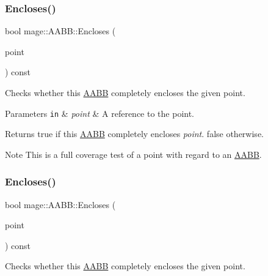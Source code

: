 \subsubsection{\texorpdfstring{Encloses()}{Encloses()}\hspace{0.1cm}{\footnotesize\ttfamily [1/4]}}
{\footnotesize\ttfamily bool mage\+::\+A\+A\+B\+B\+::\+Encloses (\begin{DoxyParamCaption}\item[{const \hyperlink{structmage_1_1_point3}{Point3} \&}]{point }\end{DoxyParamCaption}) const\hspace{0.3cm}{\ttfamily [noexcept]}}

Checks whether this \hyperlink{structmage_1_1_a_a_b_b}{A\+A\+BB} completely encloses the given point.


\begin{DoxyParams}[1]{Parameters}
\mbox{\tt in}  & {\em point} & A reference to the point. \\
\hline
\end{DoxyParams}
\begin{DoxyReturn}{Returns}
{\ttfamily true} if this \hyperlink{structmage_1_1_a_a_b_b}{A\+A\+BB} completely encloses {\itshape point}. {\ttfamily false} otherwise. 
\end{DoxyReturn}
\begin{DoxyNote}{Note}
This is a full coverage test of a point with regard to an \hyperlink{structmage_1_1_a_a_b_b}{A\+A\+BB}. 
\end{DoxyNote}
\hypertarget{structmage_1_1_a_a_b_b_a7ad6bd87a94fca3995c3eb876f52404c}{}\label{structmage_1_1_a_a_b_b_a7ad6bd87a94fca3995c3eb876f52404c} 
\subsubsection{\texorpdfstring{Encloses()}{Encloses()}\hspace{0.1cm}{\footnotesize\ttfamily [2/4]}}
{\footnotesize\ttfamily bool mage\+::\+A\+A\+B\+B\+::\+Encloses (\begin{DoxyParamCaption}\item[{F\+X\+M\+V\+E\+C\+T\+OR}]{point }\end{DoxyParamCaption}) const\hspace{0.3cm}{\ttfamily [noexcept]}}

Checks whether this \hyperlink{structmage_1_1_a_a_b_b}{A\+A\+BB} completely encloses the given point.


